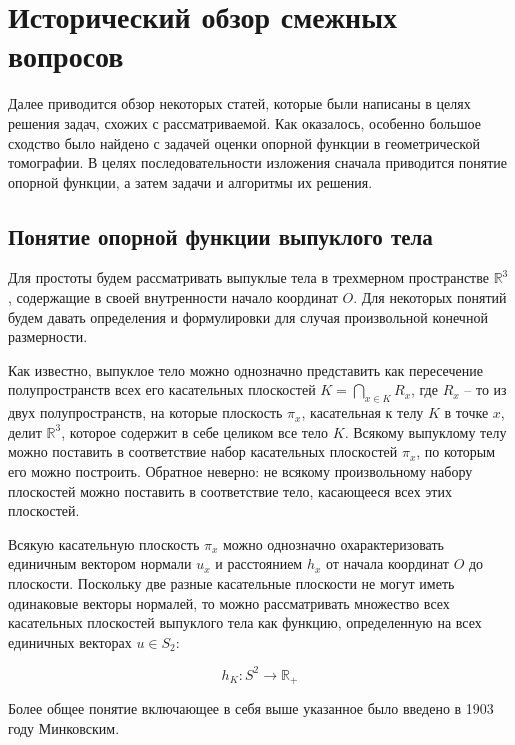 \documentclass[a4paper, 12pt, titlepage]{article}
\theoremstyle{definition}
\theoremstyle{plain}
\begin{document}
\newpage
\section{Исторический обзор смежных вопросов}
\label{sec:history}

Далее приводится обзор некоторых статей, которые были написаны в целях решения
задач, схожих с рассматриваемой. Как оказалось, особенно большое сходство было
найдено с задачей оценки опорной функции в геометрической томографии. В целях
последовательности изложения сначала приводится понятие опорной функции, а
затем задачи и алгоритмы их решения.

\subsection{Понятие опорной функции выпуклого тела}
\label{sec:support-function}

Для простоты будем рассматривать выпуклые тела в трехмерном пространстве
$\mathbb{R}^{3}$, содержащие в своей внутренности начало координат $O$.
Для некоторых понятий будем давать определения и формулировки для случая
произвольной конечной размерности.

Как известно, выпуклое тело можно однозначно представить как пересечение 
полупространств всех его касательных плоскостей 
$K = \bigcap \limits_{x \in K} R_{x}$, где $R_{x}$ -- то из двух
полупространств, на которые плоскость $\pi_{x}$, касательная к телу $K$ в
точке $x$, делит $\mathbb{R}^{3}$, которое содержит в себе целиком все тело
$K$. Всякому выпуклому телу можно поставить в соответствие набор касательных 
плоскостей $\pi_{x}$, по которым его можно построить. Обратное неверно: не
всякому произвольному набору плоскостей можно поставить в соответствие тело,
касающееся всех этих плоскостей.

Всякую касательную плоскость $\pi_{x}$ можно однозначно охарактеризовать
единичным вектором нормали $u_{x}$ и расстоянием $h_{x}$ от начала координат 
$O$ до плоскости. Поскольку две разные касательные плоскости не могут иметь
одинаковые векторы нормалей, то можно рассматривать множество всех касательных
плоскостей выпуклого тела как функцию, определенную на всех единичных векторах
$u \in S_{2}$:

\begin{equation}h_{K}: S^{2} \to \mathbb{R}_{+}\end{equation}

Более общее понятие включающее в себя выше указанное было введено в 1903 году
Минковским.
\end{document}
